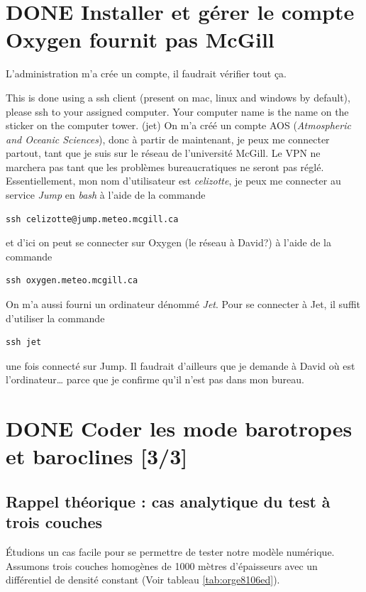 \documentclass[10pt]{article}
\numberwithin{equation}{section}
\begin{document}
\section{{\bfseries\sffamily DONE} Installer et gérer le compte Oxygen fournit pas McGill}
\label{sec:org1800286}
L'administration m'a crée un compte, il faudrait vérifier tout ça.

This is done using a ssh client (present on mac, linux and windows by default), please ssh to your assigned computer. Your computer name is the name on the sticker on the computer tower. (jet)
On m'a créé un compte AOS (\emph{Atmospheric and Oceanic Sciences}), donc à partir de maintenant, je peux me connecter partout, tant que je suis sur le réseau de l'université McGill.
Le VPN ne marchera pas tant que les problèmes bureaucratiques ne seront pas réglé.\\[0pt]

Essentiellement, mon nom d'utilisateur est \emph{celizotte}, je peux me connecter au service \emph{Jump} en \emph{bash} à l'aide de la commande
\begin{verbatim}
ssh celizotte@jump.meteo.mcgill.ca
\end{verbatim}
et d'ici on peut se connecter sur Oxygen (le réseau à David?) à l'aide de la commande
\begin{verbatim}
ssh oxygen.meteo.mcgill.ca
\end{verbatim}

On m'a aussi fourni un ordinateur dénommé \emph{Jet}. Pour se connecter à Jet, il suffit d'utiliser la commande
\begin{verbatim}
ssh jet
\end{verbatim}
une fois connecté sur Jump. Il faudrait d'ailleurs que je demande à David où est l'ordinateur\ldots{} parce que je confirme qu'il n'est pas dans mon bureau.

\section{{\bfseries\sffamily DONE} Coder les mode barotropes et baroclines [3/3]}
\label{sec:org482dcd3}
\subsection{Rappel théorique : cas analytique du test à trois couches}
\label{sec:org5084a3e}
Étudions un cas facile pour se permettre de tester notre modèle numérique.
Assumons trois couches homogènes de 1000 mètres d'épaisseurs avec un différentiel de densité constant (Voir tableau \ref{tab:orge8106ed}).
\end{document}
